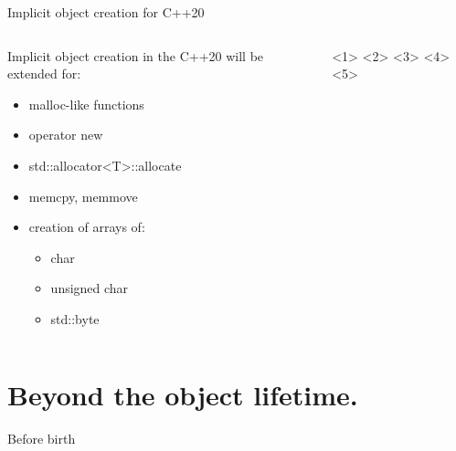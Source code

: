 \documentclass{panicsoftware-presentation}
\makeatletter
\newenvironment{itemizeSeq}{\begin{itemize}[<+-|alert@+>]}{\end{itemize}}
\makeatother
\begin{document}
\begin{frame}{Implicit object creation for C++20}

\begin{columns}

\begin{column}{0.45\linewidth}


Implicit object creation in the C++20 will be extended for:

\begin{itemizeSeq}

\item malloc-like functions
\item operator new
\item std::allocator<T>::allocate
\item memcpy, memmove
\item creation of arrays of:
\begin{itemize}[<5->]
	\item char
	\item unsigned char
	\item std::byte
\end{itemize}

\end{itemizeSeq}

\end{column}

\begin{column}{0.55\linewidth}

<1>
<2>
<3>
<4>
<5>

\end{column}

\end{columns}


\end{frame}

\section{Beyond the object lifetime.}

\begin{frame}{Before birth}

\end{frame}
\end{document}
